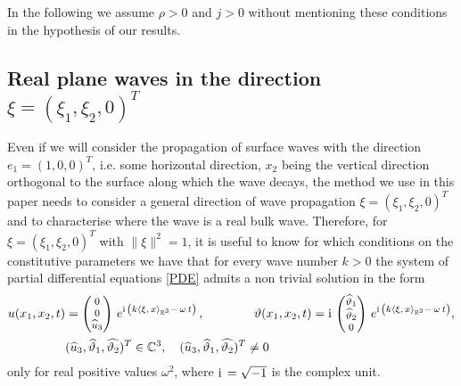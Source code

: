 \documentclass[10pt]{article}
\begin{document}
In the following we assume $\rho>0$ and $j>0$ without mentioning these conditions in the hypothesis of our results.
\subsection{Real plane waves in the direction $\xi = (\xi_1,\xi_2,0)^T$ }\label{Rpw}

{Even if  we will  consider the  propagation of  surface waves with the direction $e_1 =
	(1,0,0)^T$, i.e. some horizontal direction, $x_2$ being the vertical direction orthogonal
	to the surface along which the wave decays, the method we use in this paper needs  to consider a general direction of wave propagation $\xi = (\xi_1,\xi_2,0)^T$ and to characterise  where the wave is
	a real bulk wave. Therefore, for  $\xi=(\xi_1,\xi_2,0)^T$ with $\lVert{\xi}\rVert^2=1$}, it is useful to {know} for which conditions on the constitutive parameters we have that for every  wave number $k>0$  the system of partial differential equations \eqref{PDE} admits a non trivial solution in the form
\begin{align}\label{rwr}
	u(x_1,x_2,t)&=\begin{footnotesize}\begin{pmatrix}0\\0\\\widehat{u}_3\end{pmatrix}\end{footnotesize}
	\, e^{{\rm i}\, \left(k\langle {\xi},\, x\rangle_{\mathbb{R}^3}-\,\omega \,t\right)}\,,\qquad\qquad  \vartheta (x_1,x_2,t)=\begin{footnotesize}{\rm i}\,\begin{pmatrix}\widehat{\vartheta }_1\\\widehat{\vartheta }_2\\0\end{pmatrix}\end{footnotesize} \, e^{{\rm i}\, \left(k\langle {\xi},\, x\rangle_{\mathbb{R}^3}-\,\omega \,t\right)},\\&
	(\widehat{u}_3,\widehat{\vartheta }_1, \widehat{ \vartheta_2   })^T\in\mathbb{C}^{3}, \quad (\widehat{u}_3,\widehat{\vartheta }_1, \widehat{ \vartheta_2   })^T\neq 0\,\notag
\end{align}
only for real positive values $\omega^2$, where ${\rm i}\,=\sqrt{-1}$ is the complex unit.  
\end{document}
